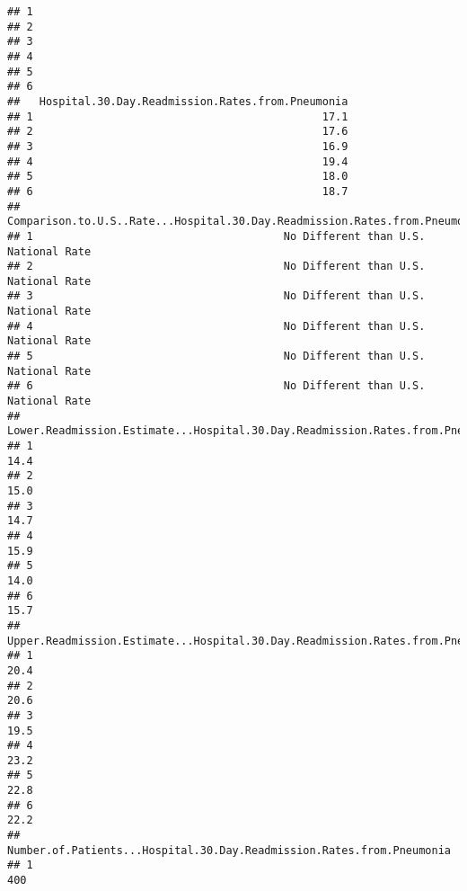 \documentclass[
]{article}
\begin{document}
\begin{verbatim}
## 1                                                                
## 2                                                                
## 3                                                                
## 4                                                                
## 5                                                                
## 6                                                                
##   Hospital.30.Day.Readmission.Rates.from.Pneumonia
## 1                                             17.1
## 2                                             17.6
## 3                                             16.9
## 4                                             19.4
## 5                                             18.0
## 6                                             18.7
##   Comparison.to.U.S..Rate...Hospital.30.Day.Readmission.Rates.from.Pneumonia
## 1                                       No Different than U.S. National Rate
## 2                                       No Different than U.S. National Rate
## 3                                       No Different than U.S. National Rate
## 4                                       No Different than U.S. National Rate
## 5                                       No Different than U.S. National Rate
## 6                                       No Different than U.S. National Rate
##   Lower.Readmission.Estimate...Hospital.30.Day.Readmission.Rates.from.Pneumonia
## 1                                                                          14.4
## 2                                                                          15.0
## 3                                                                          14.7
## 4                                                                          15.9
## 5                                                                          14.0
## 6                                                                          15.7
##   Upper.Readmission.Estimate...Hospital.30.Day.Readmission.Rates.from.Pneumonia
## 1                                                                          20.4
## 2                                                                          20.6
## 3                                                                          19.5
## 4                                                                          23.2
## 5                                                                          22.8
## 6                                                                          22.2
##   Number.of.Patients...Hospital.30.Day.Readmission.Rates.from.Pneumonia
## 1                                                                   400

\end{verbatim}
\end{document}
